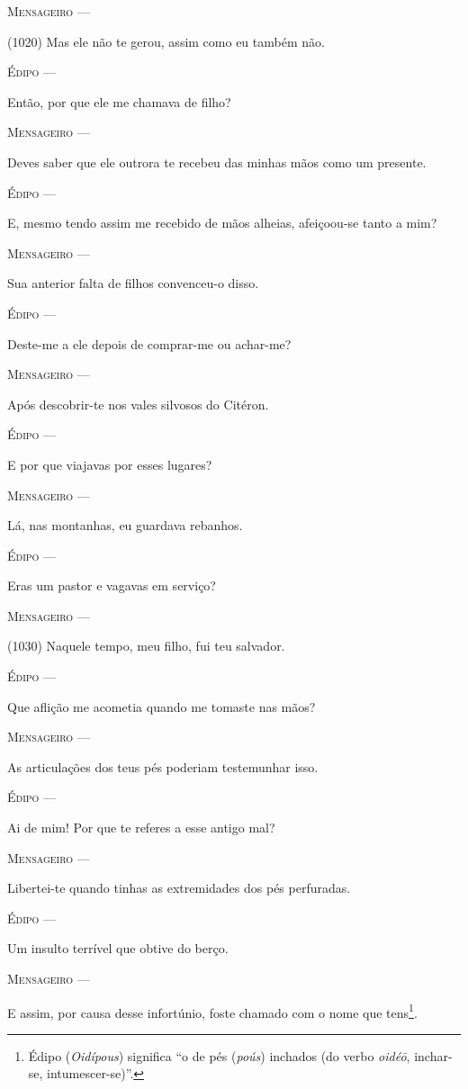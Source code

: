 \textsc{Mensageiro} ---

(1020) Mas ele não te gerou, assim como eu também não.

\textsc{Édipo} ---

Então, por que ele me chamava de filho?

\textsc{Mensageiro} ---

Deves saber que ele outrora te recebeu das minhas mãos como um presente.

\textsc{Édipo} ---

E, mesmo tendo assim me recebido de mãos alheias, afeiçoou-se tanto a
mim?

\textsc{Mensageiro} ---

Sua anterior falta de filhos convenceu-o disso.

\textsc{Édipo} ---

Deste-me a ele depois de comprar-me ou achar-me?

\textsc{Mensageiro} ---

Após descobrir-te nos vales silvosos do Citéron.

\textsc{Édipo} ---

E por que viajavas por esses lugares?

\textsc{Mensageiro} ---

Lá, nas montanhas, eu guardava rebanhos.

\textsc{Édipo} ---

Eras um pastor e vagavas em serviço?

\textsc{Mensageiro} ---

(1030) Naquele tempo, meu filho, fui teu salvador.

\textsc{Édipo} ---

Que aflição me acometia quando me tomaste nas mãos?

\textsc{Mensageiro} ---

As articulações dos teus pés poderiam testemunhar isso.

\textsc{Édipo} ---

Ai de mim! Por que te referes a esse antigo mal?

\textsc{Mensageiro} ---

Libertei-te quando tinhas as extremidades dos pés perfuradas.

\textsc{Édipo} ---

Um insulto terrível que obtive do berço.

\textsc{Mensageiro} ---

E assim, por causa desse infortúnio, foste chamado com o nome que
tens\footnote{Édipo (\emph{Oidípous}) significa ``o de pés (\emph{poús})
  inchados (do verbo \emph{oidéō}, inchar-se, intumescer-se)''.}.

